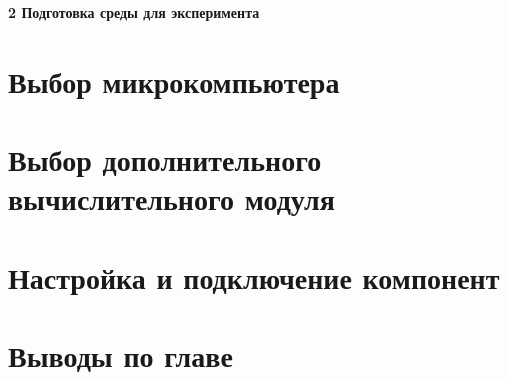\newpage
\begin{flushleft}
  \textbf{\large 2 Подготовка среды для эксперимента }
\end{flushleft}

\section{Выбор микрокомпьютера}

\section{Выбор дополнительного вычислительного модуля}

\section{Настройка и подключение компонент}

\section{Выводы по главе}